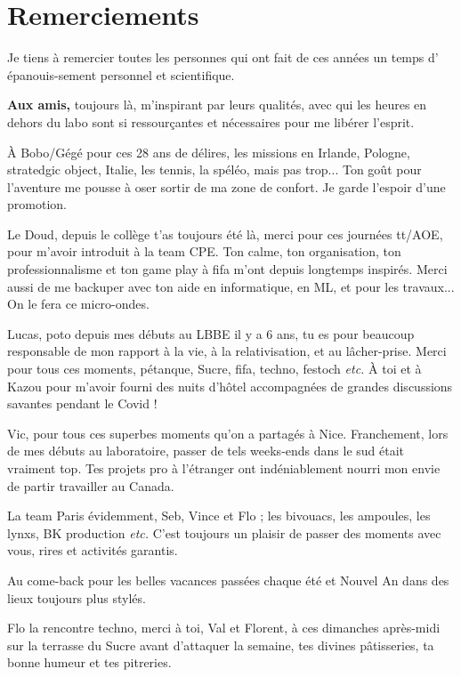 \thispagestyle{empty}
\vspace*{-80pt}

\section*{\large{Remerciements}}
\vspace*{-5pt}

Je tiens à remercier toutes les personnes qui ont fait de ces années un temps d'
épanouis-sement personnel et scientifique.

\vspace*{7pt}
\textbf{Aux amis,} 
toujours là, m'inspirant par leurs qualités, avec qui les heures en dehors du labo sont si ressourçantes et nécessaires pour me libérer l'esprit.

À Bobo/Gégé pour ces 28 ans de délires, les missions en Irlande, Pologne, stratedgic object, Italie, les tennis, la spéléo, mais pas trop... Ton goût pour l'aventure me pousse à oser sortir de ma zone de confort. Je garde l'espoir d'une promotion.

Le Doud, depuis le collège t'as toujours été là, merci pour ces journées tt/AOE, pour m'avoir introduit à la team CPE. Ton calme, ton organisation, ton professionnalisme et ton game play à fifa m'ont depuis longtemps inspirés. Merci aussi de me backuper avec ton aide en informatique, en ML, et pour les travaux... On le fera ce micro-ondes.

Lucas, poto depuis mes débuts au LBBE il y a 6 ans, tu es pour beaucoup responsable de mon rapport à la vie, à la relativisation, et au lâcher-prise. Merci pour tous ces moments, pétanque, Sucre, fifa, techno, festoch \textit{etc.} À toi et à Kazou pour m'avoir fourni des nuits d'hôtel accompagnées de grandes discussions savantes pendant le Covid !

Vic, pour tous ces superbes moments qu'on a partagés à Nice. Franchement, lors de mes débuts au laboratoire, passer de tels weeks-ends dans le sud était vraiment top. Tes projets pro à l'étranger ont indéniablement nourri mon envie de partir travailler au Canada.

La team Paris évidemment, Seb, Vince et Flo ; les bivouacs, les ampoules, les lynxs, BK production \textit{etc.} C'est toujours un plaisir de passer des moments avec vous, rires et activités garantis.

Au come-back pour les belles vacances passées chaque été et Nouvel An dans des lieux toujours plus stylés.

Flo la rencontre techno, merci à toi, Val et Florent, à ces dimanches après-midi sur la terrasse du Sucre avant d'attaquer la semaine, tes divines pâtisseries, ta bonne humeur et tes pitreries.


